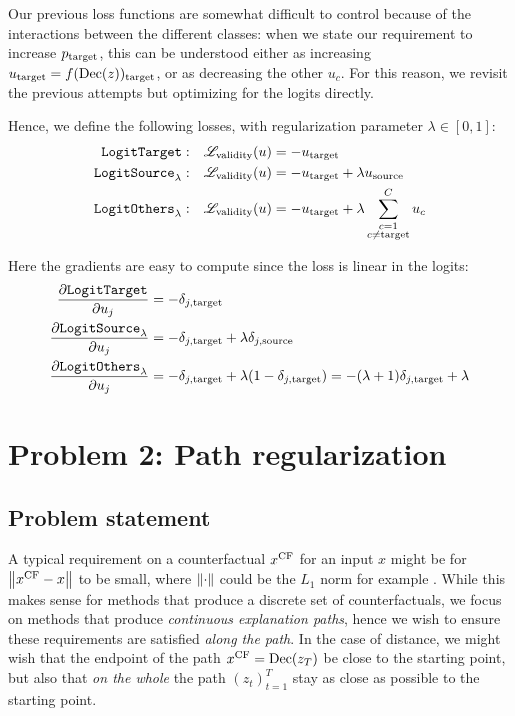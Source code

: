 \documentclass[../main.tex]{subfiles}
\begin{document}
Our previous loss functions are somewhat difficult to control because of the interactions between the different classes:
when we state our requirement to increase $p_{\mathrm{target}}$, this can be understood either as increasing $u_{\mathrm{target}} = f(\operatorname{Dec}(z))_{\mathrm{target}}$, or as decreasing the other $u_c$.
For this reason, we revisit the previous attempts but optimizing for the logits directly.

Hence, we define the following losses, with regularization parameter $\lambda \in [0, 1]$:
\begin{align*}
    \mathtt{LogitTarget}{}:        & \quad    \mathscr{L}_\text{validity}(u) = - u_{\mathrm{target}}                         \\
    \mathtt{LogitSource}_{\lambda}: & \quad     \mathscr{L}_\text{validity}(u) = - u_{\mathrm{target}} + \lambda u_{\mathrm{source}}    \\
    \mathtt{LogitOthers}_{\lambda}: & \quad    \mathscr{L}_\text{validity}(u) = - u_{\mathrm{target}} + \lambda \sum_{\substack{{c}=1 \\ {c} \neq \mathrm{target}}}^C u_c
\end{align*}

Here the gradients are easy to compute since the loss is linear in the logits:
\begin{align*}
\frac{\partial \mathtt{LogitTarget}{}}{\partial u_j} &= - \delta_{j, \mathrm{target}}                         \\
\frac{\partial \mathtt{LogitSource}_{\lambda}}{\partial u_j} &= - \delta_{j, \mathrm{target}} + \lambda \delta_{j, \mathrm{source}}                        \\
\frac{\partial \mathtt{LogitOthers}_{\lambda}}{\partial u_j} &= - \delta_{j, \mathrm{target}} + \lambda (1-\delta_{j, \mathrm{target}}) = -(\lambda + 1)\delta_{j, \mathrm{target}} + \lambda
\end{align*}




\section{Problem 2: Path regularization}

\subsection{Problem statement}

A typical requirement on a counterfactual $x^\mathrm{CF}$ for an input $x$ might be for $\left\lVert x^\mathrm{CF} - x\right\rVert$ to be small, where $\left\lVert\cdot\right\rVert$ could be the $L_1$ norm for example .
While this makes sense for methods that produce a discrete set of counterfactuals, we focus on methods that produce \emph{continuous explanation paths}, hence we wish to ensure these requirements are satisfied \emph{along the path}.
In the case of distance, we might wish that the endpoint of the path $x^\mathrm{CF} = \operatorname{Dec}(z_T)$ be close to the starting point, but also that \emph{on the whole} the path $(z_t)_{t=1}^T$ stay as close as possible to the starting point.
\end{document}
